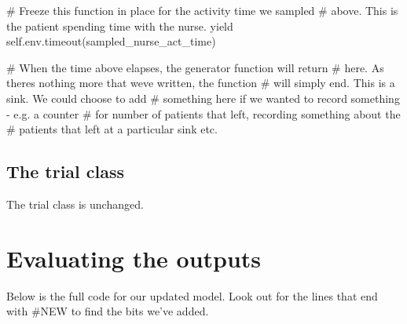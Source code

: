 \documentclass[
  letterpaper,
  DIV=11,
  numbers=noendperiod]{scrreprt}
\newenvironment{Shaded}{\begin{snugshade}}{\end{snugshade}}
\newcommand{\CommentTok}[1]{\textcolor[rgb]{0.37,0.37,0.37}{#1}}
\newcommand{\ControlFlowTok}[1]{\textcolor[rgb]{0.00,0.23,0.31}{#1}}
\newcommand{\NormalTok}[1]{\textcolor[rgb]{0.00,0.23,0.31}{#1}}
\newcommand{\VariableTok}[1]{\textcolor[rgb]{0.07,0.07,0.07}{#1}}
\begin{document}
\begin{Shaded}
\begin{Highlighting}[]
            \CommentTok{\# Freeze this function in place for the activity time we sampled}
            \CommentTok{\# above.  This is the patient spending time with the nurse.}
            \ControlFlowTok{yield} \VariableTok{self}\NormalTok{.env.timeout(sampled\_nurse\_act\_time)}

            \CommentTok{\# When the time above elapses, the generator function will return}
            \CommentTok{\# here.  As there\textquotesingle{}s nothing more that we\textquotesingle{}ve written, the function}
            \CommentTok{\# will simply end.  This is a sink.  We could choose to add}
            \CommentTok{\# something here if we wanted to record something {-} e.g. a counter}
            \CommentTok{\# for number of patients that left, recording something about the}
            \CommentTok{\# patients that left at a particular sink etc.}
\end{Highlighting}
\end{Shaded}

\subsection{The trial class}\label{the-trial-class}

The trial class is unchanged.

\section{Evaluating the outputs}\label{evaluating-the-outputs}

Below is the full code for our updated model. Look out for the lines
that end with \#NEW to find the bits we've added.
\end{document}
